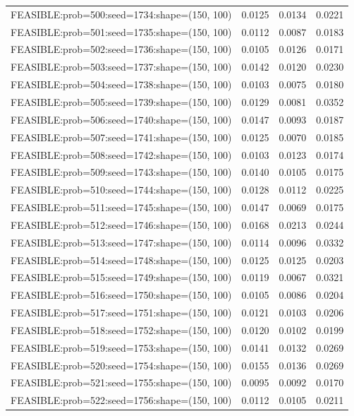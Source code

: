\begin{longtable}{lccc}
FEASIBLE:prob=500:seed=1734:shape=(150, 100) &   0.0125 & 0.0134 & 0.0221 \\
FEASIBLE:prob=501:seed=1735:shape=(150, 100) &   0.0112 & 0.0087 & 0.0183 \\
FEASIBLE:prob=502:seed=1736:shape=(150, 100) &   0.0105 & 0.0126 & 0.0171 \\
FEASIBLE:prob=503:seed=1737:shape=(150, 100) &   0.0142 & 0.0120 & 0.0230 \\
FEASIBLE:prob=504:seed=1738:shape=(150, 100) &   0.0103 & 0.0075 & 0.0180 \\
FEASIBLE:prob=505:seed=1739:shape=(150, 100) &   0.0129 & 0.0081 & 0.0352 \\
FEASIBLE:prob=506:seed=1740:shape=(150, 100) &   0.0147 & 0.0093 & 0.0187 \\
FEASIBLE:prob=507:seed=1741:shape=(150, 100) &   0.0125 & 0.0070 & 0.0185 \\
FEASIBLE:prob=508:seed=1742:shape=(150, 100) &   0.0103 & 0.0123 & 0.0174 \\
FEASIBLE:prob=509:seed=1743:shape=(150, 100) &   0.0140 & 0.0105 & 0.0175 \\
FEASIBLE:prob=510:seed=1744:shape=(150, 100) &   0.0128 & 0.0112 & 0.0225 \\
FEASIBLE:prob=511:seed=1745:shape=(150, 100) &   0.0147 & 0.0069 & 0.0175 \\
FEASIBLE:prob=512:seed=1746:shape=(150, 100) &   0.0168 & 0.0213 & 0.0244 \\
FEASIBLE:prob=513:seed=1747:shape=(150, 100) &   0.0114 & 0.0096 & 0.0332 \\
FEASIBLE:prob=514:seed=1748:shape=(150, 100) &   0.0125 & 0.0125 & 0.0203 \\
FEASIBLE:prob=515:seed=1749:shape=(150, 100) &   0.0119 & 0.0067 & 0.0321 \\
FEASIBLE:prob=516:seed=1750:shape=(150, 100) &   0.0105 & 0.0086 & 0.0204 \\
FEASIBLE:prob=517:seed=1751:shape=(150, 100) &   0.0121 & 0.0103 & 0.0206 \\
FEASIBLE:prob=518:seed=1752:shape=(150, 100) &   0.0120 & 0.0102 & 0.0199 \\
FEASIBLE:prob=519:seed=1753:shape=(150, 100) &   0.0141 & 0.0132 & 0.0269 \\
FEASIBLE:prob=520:seed=1754:shape=(150, 100) &   0.0155 & 0.0136 & 0.0269 \\
FEASIBLE:prob=521:seed=1755:shape=(150, 100) &   0.0095 & 0.0092 & 0.0170 \\
FEASIBLE:prob=522:seed=1756:shape=(150, 100) &   0.0112 & 0.0105 & 0.0211 \\

\end{longtable}
